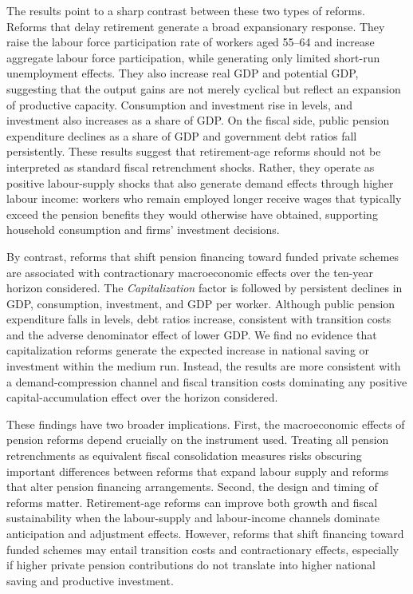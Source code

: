 \documentclass[11pt,english,a4paper, twoside, authoryear]{article}
\begin{document}
The results point to a sharp contrast between these two types of reforms. Reforms that delay retirement generate a broad expansionary response. They raise the labour force participation rate of workers aged 55--64 and increase aggregate labour force participation, while generating only limited short-run unemployment effects. They also increase real GDP and potential GDP, suggesting that the output gains are not merely cyclical but reflect an expansion of productive capacity. Consumption and investment rise in levels, and investment also increases as a share of GDP. On the fiscal side, public pension expenditure declines as a share of GDP and government debt ratios fall persistently. These results suggest that retirement-age reforms should not be interpreted as standard fiscal retrenchment shocks. Rather, they operate as positive labour-supply shocks that also generate demand effects through higher labour income: workers who remain employed longer receive wages that typically exceed the pension benefits they would otherwise have obtained, supporting household consumption and firms' investment decisions.

By contrast, reforms that shift pension financing toward funded private schemes are associated with contractionary macroeconomic effects over the ten-year horizon considered. The \emph{Capitalization} factor is followed by persistent declines in GDP, consumption, investment, and GDP per worker. Although public pension expenditure falls in levels, debt ratios increase, consistent with transition costs and the adverse denominator effect of lower GDP. We find no evidence that capitalization reforms generate the expected increase in national saving or investment within the medium run. Instead, the results are more consistent with a demand-compression channel and fiscal transition costs dominating any positive capital-accumulation effect over the horizon considered.

These findings have two broader implications. First, the macroeconomic effects of pension reforms depend crucially on the instrument used. Treating all pension retrenchments as equivalent fiscal consolidation measures risks obscuring important differences between reforms that expand labour supply and reforms that alter pension financing arrangements. Second, the design and timing of reforms matter. Retirement-age reforms can improve both growth and fiscal sustainability when the labour-supply and labour-income channels dominate anticipation and adjustment effects. However, reforms that shift financing toward funded schemes may entail transition costs and contractionary effects, especially if higher private pension contributions do not translate into higher national saving and productive investment.
\end{document}
